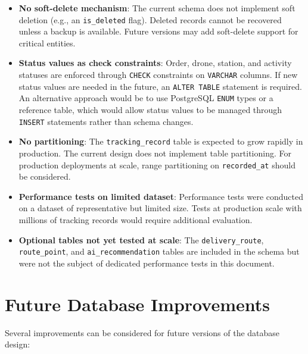\begin{itemize}
    \item \textbf{No soft-delete mechanism}: The current schema does not implement soft deletion (e.g., an \texttt{is\_deleted} flag). Deleted records cannot be recovered unless a backup is available. Future versions may add soft-delete support for critical entities.
    \item \textbf{Status values as check constraints}: Order, drone, station, and activity statuses are enforced through \texttt{CHECK} constraints on \texttt{VARCHAR} columns. If new status values are needed in the future, an \texttt{ALTER TABLE} statement is required. An alternative approach would be to use PostgreSQL \texttt{ENUM} types or a reference table, which would allow status values to be managed through \texttt{INSERT} statements rather than schema changes.
    \item \textbf{No partitioning}: The \texttt{tracking\_record} table is expected to grow rapidly in production. The current design does not implement table partitioning. For production deployments at scale, range partitioning on \texttt{recorded\_at} should be considered.
    \item \textbf{Performance tests on limited dataset}: Performance tests were conducted on a dataset of representative but limited size. Tests at production scale with millions of tracking records would require additional evaluation.
    \item \textbf{Optional tables not yet tested at scale}: The \texttt{delivery\_route}, \texttt{route\_point}, and \texttt{ai\_recommendation} tables are included in the schema but were not the subject of dedicated performance tests in this document.
\end{itemize}

\section{Future Database Improvements}\label{s:future}

Several improvements can be considered for future versions of the database design:

